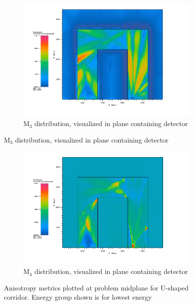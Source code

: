 \begin{figure}[htb!]
  \centering
  \begin{subfigure}[t]{\textwidth}
    \includegraphics[width=0.9\linewidth]{./chapters/characterization_probs/figures/char/prob_2/prob2M3G26.png}
    \caption{M$_3$ distribution, visualized in plane containing detector}
    \label{fig:ubendM3}
  \end{subfigure}
\end{figure}
\begin{figure}[htb!]\ContinuedFloat
  \centering
  \begin{subfigure}[t]{\textwidth}
    \includegraphics[width=0.9\linewidth]{./chapters/characterization_probs/figures/char/prob_2/prob2M4G26.png}
    \caption{M$_4$ distribution, visualized in plane containing detector}
    \label{fig:ubendM4}
  \end{subfigure}
  \caption[Anisotropy metrics plotted at problem midplane for U-shaped
  corridor.]{Anisotropy metrics plotted at problem midplane for U-shaped
    corridor. Energy group shown is for lowest energy}
  \label{fig:ubendmetrics}
\end{figure}

